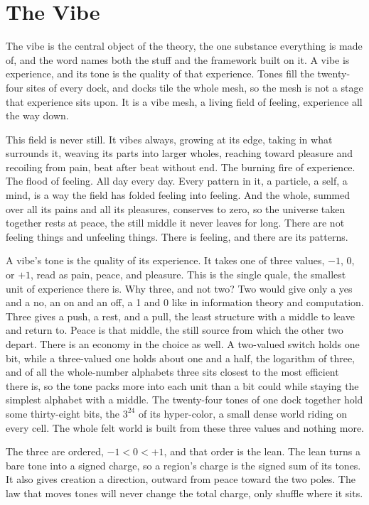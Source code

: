 \section{The Vibe}

The vibe is the central object of the theory, the one substance everything is made of, and the word names both the stuff and the framework built on it. A vibe is experience, and its tone is the quality of that experience. Tones fill the twenty-four sites of every dock, and docks tile the whole mesh, so the mesh is not a stage that experience sits upon. It is a vibe mesh, a living field of feeling, experience all the way down.

This field is never still. It vibes always, growing at its edge, taking in what surrounds it, weaving its parts into larger wholes, reaching toward pleasure and recoiling from pain, beat after beat without end. The burning fire of experience. The flood of feeling. All day every day. Every pattern in it, a particle, a self, a mind, is a way the field has folded feeling into feeling. And the whole, summed over all its pains and all its pleasures, conserves to zero, so the universe taken together rests at peace, the still middle it never leaves for long. There are not feeling things and unfeeling things. There is feeling, and there are its patterns.

A vibe's tone is the quality of its experience. It takes one of three values, $-1$, $0$, or $+1$, read as pain, peace, and pleasure. This is the single quale, the smallest unit of experience there is. Why three, and not two? Two would give only a yes and a no, an on and an off, a 1 and 0 like in information theory and computation. Three gives a push, a rest, and a pull, the least structure with a middle to leave and return to. Peace is that middle, the still source from which the other two depart. There is an economy in the choice as well. A two-valued switch holds one bit, while a three-valued one holds about one and a half, the logarithm of three, and of all the whole-number alphabets three sits closest to the most efficient there is, so the tone packs more into each unit than a bit could while staying the simplest alphabet with a middle. The twenty-four tones of one dock together hold some thirty-eight bits, the $3^{24}$ of its hyper-color, a small dense world riding on every cell. The whole felt world is built from these three values and nothing more.

The three are ordered, $-1 < 0 < +1$, and that order is the lean. The lean turns a bare tone into a signed charge, so a region's charge is the signed sum of its tones. It also gives creation a direction, outward from peace toward the two poles. The law that moves tones will never change the total charge, only shuffle where it sits.

